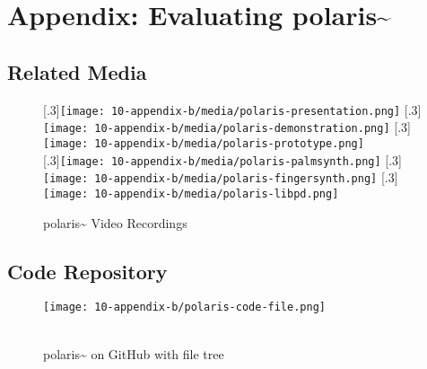 \chapter{Appendix: Evaluating polaris\textasciitilde{}}

\section{Related Media}
\begin{figure}[!ht]
    \centering
    [.3\linewidth]{\texttt{[image: 10-appendix-b/media/polaris-presentation.png]}}
    \hfill
    [.3\linewidth]{\texttt{[image: 10-appendix-b/media/polaris-demonstration.png]}}
    \hfill
    [.3\linewidth]{\texttt{[image: 10-appendix-b/media/polaris-prototype.png]}} \\
    [.3\linewidth]{\texttt{[image: 10-appendix-b/media/polaris-palmsynth.png]}}
    \hfill
    [.3\linewidth]{\texttt{[image: 10-appendix-b/media/polaris-fingersynth.png]}}
    \hfill
    [.3\linewidth]{\texttt{[image: 10-appendix-b/media/polaris-libpd.png]}}%
    \caption*{polaris\textasciitilde{} Video Recordings}
\end{figure}
\clearpage



\section{Code Repository}
\begin{figure}[!ht]
    \centering
    \texttt{[image: 10-appendix-b/polaris-code-file.png]}
    \caption*{ \\ polaris\textasciitilde{} on GitHub with file tree}
\end{figure}
\clearpage



